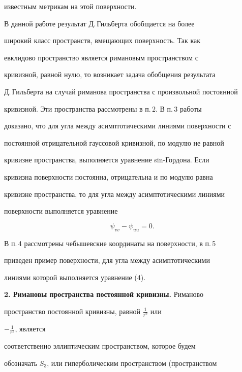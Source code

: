известным метрикам на этой поверхности. 


 


В данной работе результат Д.\,Гильберта обобщается на более 


широкий класс пространств, вмещающих поверхность. Так как 


евклидово пространство является римановым пространством с 


кривизной, равной нулю, то возникает задача обобщения результата 


Д.\,Гильберта на случай риманова пространства с произвольной постоянной 


кривизной. Эти пространства рассмотрены в п.\,2. В п.\,3 работы 


доказано, что для угла между асимптотическими линиями поверхности с 


постоянной отрицательной гауссовой кривизной, по модулю не равной 


кривизне пространства, выполняется уравнение sin-Гордона. Если 


кривизна поверхности постоянна, отрицательна и по модулю равна 


кривизне пространства, то для угла между асимптотическими линиями 


поверхности выполняется уравнение 


\begin{equation} 


\psi_{v v}-\psi_{u u}=0. 


\end{equation} 


В п.\,4 рассмотрены чебышевские координаты на поверхности, в п.\,5 


приведен пример поверхности, для угла между асимптотическими 


линиями которой выполняется уравнение (4). 


\medskip 


 


{\bf 2. Римановы пространства постоянной кривизны.} Риманово 


пространство постоянной кривизны, равной $\frac{1}{r^2}$ или 


$-\frac{1}{r^2}$, является 


соответственно эллиптическим пространством, которое будем 


обозначать $S_3$, или гиперболическим пространством (пространством 


